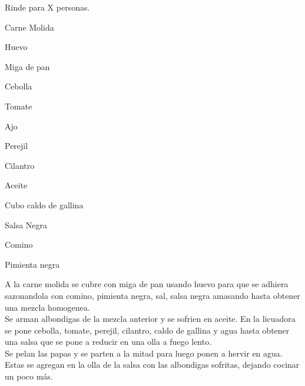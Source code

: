 
Rinde para X personas.

\begin{ingredientes}
\item Carne Molida
\item Huevo
\item Miga de pan
\item Cebolla
\item Tomate
\item Ajo
\item Perejil
\item Cilantro
\item Aceite
\item Cubo caldo de gallina
\item Salsa Negra
\item Comino
\item Pimienta negra
\end{ingredientes}
\preparacion
A la carne molida se cubre con miga de pan usando huevo para que se adhiera sazonandola con comino, pimienta negra, sal, salsa negra amasando hasta obtener una mezcla homogenea.\\

Se arman albondigas de la mezcla anterior  y se sofrien en aceite. En la licuadora se pone cebolla, tomate, perejil, cilantro, caldo de gallina y agua hasta obtener una salsa que se pone a reducir en una olla a fuego lento.\\

Se pelan las papas y se parten a la mitad para luego ponen a hervir en agua. Estas se agregan en la olla de la salsa con las albondigas sofritas, dejando cocinar un poco más.